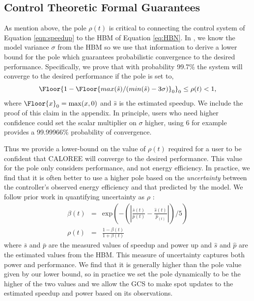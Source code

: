 \subsection{Control Theoretic Formal Guarantees}
\label{sec:guarantees}
As mention above, the pole $\rho(t)$ is critical to connecting the control
system of Equation \ref{eqn:speedup} to the HBM of Equation
\ref{eq:HBN}.  In \SYSTEM{}, we know the model variance $\sigma$ from
the HBM so we use that information to derive a lower bound for the
pole which guarantees probabilistic convergence to the desired
performance. Specifically, we prove that with probability 99.7\% the
system will converge to the desired performance if the pole is set to,
$$\Floor{1- \Floor{max(\hat{s})/(min(\hat{s}) - 3\sigma)}_0}_0 \leq \rho(t)
< 1,$$ where $\Floor{x}_0 = \max(x,0)$ and $\hat{s}$ is the
estimated speedup. We include the proof of this claim in the appendix. In principle, users who need higher confidence
could set the scalar multiplier on $\sigma$ higher, using $6$ for
example provides a 99.99966\% probability of convergence.  

Thus we provide a lower-bound on the value of $\rho(t)$ required for a
user to be confident that CALOREE will converge to the desired
performance.  This value for the pole only considers performance,
and not energy efficiency.  In practice, we find that it is
often better to use a higher pole based on the \emph{uncertainty}
between the controller's observed energy efficiency and that predicted
by the model.  We follow prior work in quantifying uncertainty as
$\rho$ \cite{Tokic2010}:
\begin{equation}
  \begin{array}{rcl}
    \beta(t) &=&  \text{exp}{\left(- \left( \left|   \frac{\bar{s}(t)}{\bar{p}(t)}  -\frac{ \hat{s}(t)}{\hat{p}_(t)} \right| \right) /5\right)} \\
    \rho(t) &=& \frac{1-\beta(t)}{1+\beta(t)} 
  \end{array}
  \label{eqn:uncer}
\end{equation}
where $\bar{s}$ and $\bar{p}$ are the measured values of speedup and
power up and $\hat{s}$ and $\hat{p}$ are the estimated values from the
HBM.  This measure of uncertainty captures both power and performance.
We find that it is generally higher than the pole value given by our
lower bound, so in practice we set the pole dynamically to be the
higher of the two values and we allow the GCS to make spot updates to
the estimated speedup and power based on its observations.  
